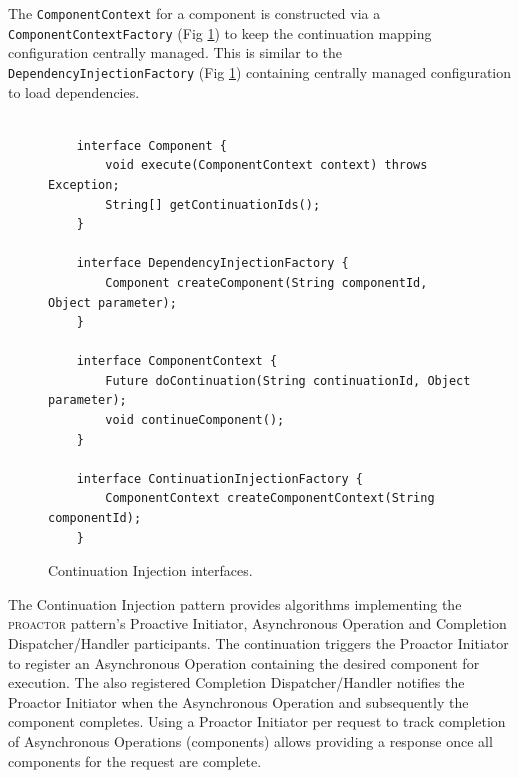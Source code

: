 \documentclass[prodmode]{style/acmlarge}
\begin{document}
The \texttt{ComponentContext} for a component is constructed via a
\texttt{ComponentContextFactory} (Fig \ref{fig:ContinuationInjectionInterfaces})
to keep the continuation mapping configuration centrally managed.  This is
similar to the \texttt{DependencyInjectionFactory} (Fig
\ref{fig:ContinuationInjectionInterfaces}) containing centrally managed
configuration to load dependencies.

\begin{figure}[tp]
\centering
\begin{verbatim}

    interface Component {
        void execute(ComponentContext context) throws Exception;
        String[] getContinuationIds();
    }

    interface DependencyInjectionFactory {
        Component createComponent(String componentId, Object parameter);
    }    

    interface ComponentContext {
        Future doContinuation(String continuationId, Object parameter);
        void continueComponent();
    }
    
    interface ContinuationInjectionFactory {
        ComponentContext createComponentContext(String componentId);
    }
\end{verbatim}
\caption{Continuation Injection interfaces\footnotemark.}
\label{fig:ContinuationInjectionInterfaces}
\end{figure}

The Continuation Injection pattern provides algorithms implementing the
\textsc{proactor} pattern's Proactive Initiator, Asynchronous Operation and
Completion Dispatcher/Handler participants.  The continuation triggers the
Proactor Initiator to register an Asynchronous Operation containing the desired
component for execution.  The also registered Completion Dispatcher/Handler
notifies the Proactor Initiator when the Asynchronous Operation and subsequently
the component completes.  Using a Proactor Initiator per request to track
completion of Asynchronous Operations (components) allows providing a response
once all components for the request are complete.
\end{document}

